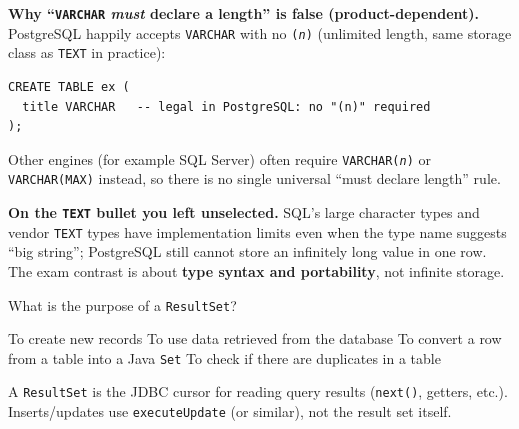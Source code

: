 \begin{solution}
  \medskip\noindent\textbf{Why ``\texttt{VARCHAR} \emph{must} declare a length'' is false (product-dependent).} PostgreSQL happily accepts \texttt{VARCHAR} with no \texttt{(\textit{n})} (unlimited length, same storage class as \texttt{TEXT} in practice):
\begin{lstlisting}[style=sql]
CREATE TABLE ex (
  title VARCHAR   -- legal in PostgreSQL: no "(n)" required
);
\end{lstlisting}
  Other engines (for example SQL Server) often require \texttt{VARCHAR(\textit{n})} or \texttt{VARCHAR(MAX)} instead, so there is no single universal ``must declare length'' rule.

  \medskip\noindent\textbf{On the \texttt{TEXT} bullet you left unselected.} SQL's large character types and vendor \texttt{TEXT} types have implementation limits even when the type name suggests ``big string''; PostgreSQL still cannot store an infinitely long value in one row. The exam contrast is about \textbf{type syntax and portability}, not infinite storage.
\end{solution}

\newpage 


\question[4]
What is the purpose of a \texttt{ResultSet}?
\begin{choices}
  \choice To create new records
  \CorrectChoice To use data retrieved from the database
  \choice To convert a row from a table into a Java \texttt{Set}
  \choice To check if there are duplicates in a table
\end{choices}
\begin{solution}
  A \texttt{ResultSet} is the JDBC cursor for reading query results (\texttt{next()}, getters, etc.). Inserts/updates use \texttt{executeUpdate} (or similar), not the result set itself.
\end{solution}

